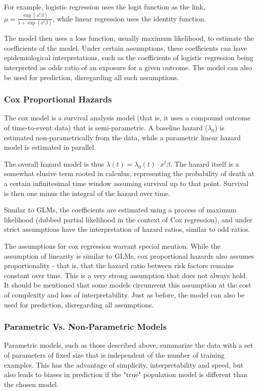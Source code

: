 \documentclass[a4paper,12pt]{article}
\begin{document}
		For example, logistic regression uses the logit function as the link, $ \mu = \frac{\exp (x^t \beta)}{1 + \exp (x^t \beta)} $, while linear regression uses the identity function.
		
		The model then uses a loss function, usually maximum likelihood, to estimate the coefficients of the model. Under certain assumptions, these coefficients can have epidemiological interpretations, such as the coefficients of logistic regression being interpreted as odds ratio of an exposure for a given outcome. The model can also be used for prediction, disregarding all such assumptions.
		
		\subsubsection{Cox Proportional Hazards}
		
		The cox model is a survival analysis model (that is, it uses a compound outcome of time-to-event data) that is semi-parametric. A baseline hazard ($ \lambda_0 $) is estimated non-parametrically from the data, while a parametric linear hazard model is estimated in parallel\cite{Cox1972}.
		
		The overall hazard model is thus $ \lambda(t) = \lambda_0(t) \cdot x^t \beta $. The hazard itself is a somewhat elusive term rooted in calculus, representing the probability of death at a certain infinitesimal time window assuming survival up to that point. Survival is then one minus the integral of the hazard over time.
		
		Similar to GLMs, the coefficients are estimated using a process of maximum likelihood (dubbed partial likelihood in the context of Cox regression), and under strict assumptions have the interpretation of hazard ratios, similar to odd ratios.
		
		The assumptions for cox regression warrant special mention. While the assumption of linearity is similar to GLMs, cox proportional hazards also assumes proportionality - that is, that the hazard ratio between risk factors remains constant over time. This is a very strong assumption that does not always hold. It should be mentioned that some models circumvent this assumption at the cost of complexity and loss of interpretability. Just as before, the model can also be used for prediction, disregarding all assumptions.
		
		\subsubsection{Parametric Vs. Non-Parametric Models}
		Parametric models, such as those described above, summarize the data with a set of parameters of fixed size that is independent of the number of training examples. This has the advantage of simplicity, interpretability and speed, but also leads to biases in prediction if the "true" population model is different than the chosen model.
		
\end{document}
